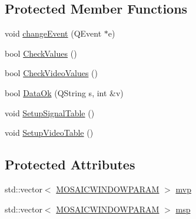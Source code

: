 \subsection*{Protected Member Functions}
\begin{CompactItemize}
\item 
void \hyperlink{class_export_mosaic_video_dialog_029e7404c6e18cc46238ee2296ea7df1}{changeEvent} (QEvent $\ast$e)
\item 
bool \hyperlink{class_export_mosaic_video_dialog_a359cf31ad2116e398758c844e64e442}{CheckValues} ()
\item 
bool \hyperlink{class_export_mosaic_video_dialog_b044f2f53678532e2c048bb697957432}{CheckVideoValues} ()
\item 
bool \hyperlink{class_export_mosaic_video_dialog_42a99b47c067271c55a492651a1607e9}{DataOk} (QString s, int \&v)
\item 
void \hyperlink{class_export_mosaic_video_dialog_4c7a3341701c0fb7cf9f3efc5da48fec}{SetupSignalTable} ()
\item 
void \hyperlink{class_export_mosaic_video_dialog_984557ee076c770ffe53b37beab0bca6}{SetupVideoTable} ()
\end{CompactItemize}
\subsection*{Protected Attributes}
\begin{CompactItemize}
\item 
std::vector$<$ \hyperlink{struct_m_o_s_a_i_c_w_i_n_d_o_w_p_a_r_a_m}{MOSAICWINDOWPARAM} $>$ \hyperlink{class_export_mosaic_video_dialog_a17b3e5b11d7ef44ef236729f02ff9bd}{mvp}
\item 
std::vector$<$ \hyperlink{struct_m_o_s_a_i_c_w_i_n_d_o_w_p_a_r_a_m}{MOSAICWINDOWPARAM} $>$ \hyperlink{class_export_mosaic_video_dialog_ae00e678799aa306deb86070a7c1d390}{msp}
\end{CompactItemize}
